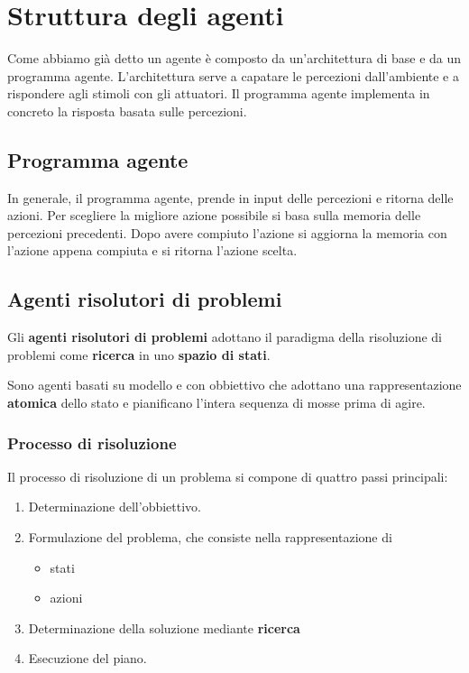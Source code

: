 \section{Struttura degli agenti}
Come abbiamo gi\`a detto un agente \`e composto da un'architettura di base e da un programma
agente. L'architettura serve a capatare le percezioni dall'ambiente e a rispondere agli
stimoli con gli attuatori. Il programma agente implementa in concreto la risposta basata
sulle percezioni.

\subsection{Programma agente}
In generale, il programma agente, prende in input delle percezioni e ritorna delle azioni.
Per scegliere la migliore azione possibile si basa sulla memoria delle percezioni precedenti.
Dopo avere compiuto l'azione si aggiorna la memoria con l'azione appena compiuta e si ritorna
l'azione scelta.

\subsection{Agenti risolutori di problemi}
Gli \textbf{agenti risolutori di problemi} adottano il paradigma della risoluzione di
problemi come \textbf{ricerca} in uno \textbf{spazio di stati}.

Sono agenti basati su modello e con obbiettivo che adottano una rappresentazione
\textbf{atomica} dello stato e pianificano l'intera sequenza di mosse prima di agire.

\subsubsection{Processo di risoluzione}
Il processo di risoluzione di un problema si compone di quattro passi principali:
\begin{enumerate}
	\item Determinazione dell'obbiettivo.
	\item Formulazione del problema, che consiste nella rappresentazione di
	      \begin{itemize}
		      \item stati
		      \item azioni
	      \end{itemize}
	\item Determinazione della soluzione mediante \textbf{ricerca}
	\item Esecuzione del piano.
\end{enumerate}

